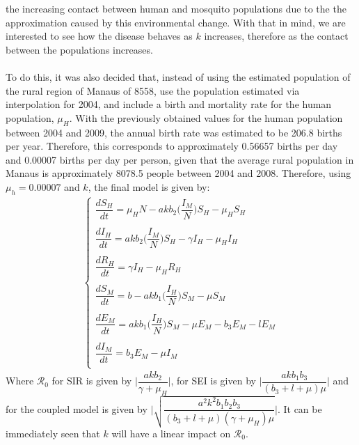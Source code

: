 the increasing contact between human and mosquito populations due to the
the approximation caused by this environmental change. With that in mind, 
we are interested to see how the disease behaves as $k$ increases, therefore
as the contact between the populations increases.
\\\\
To do this, it was also decided that, instead of using the estimated population 
of the rural region of Manaus of 8558, use the population estimated via interpolation 
for 2004, and include a birth and mortality rate for the human population, $\mu_H$. 
With the previously obtained values for the human population 
between 2004 and 2009, the annual birth rate was 
estimated to be 206.8 births per year. Therefore, this corresponds 
to approximately 0.56657 births per day and 0.00007 births per day 
per person, given that the average rural population in Manaus is 
approximately 8078.5 people between 2004 and 2008. Therefore, using $\mu_h = 0.00007$ 
and $k$, the final model is given by:
\begin{gather*}
        \begin{cases}
        \dfrac{dS_H}{dt} = \mu_HN-akb_2\bigg(\dfrac{I_M}{N}\bigg)S_H - \mu_HS_H\\
        \\
        \dfrac{dI_H}{dt} = akb_2\bigg(\dfrac{I_M}{N}\bigg)S_H-\gamma I_H - \mu_HI_H\\
        \\
        \dfrac{dR_H}{dt} = \gamma I_H - \mu_HR_H\\
        \\
        \dfrac{dS_M}{dt} = b - akb_1\bigg(\dfrac{I_H}{N}\bigg)S_M - \mu S_M\\
        \\
        \dfrac{dE_M}{dt} = akb_1\bigg(\dfrac{I_H}{N}\bigg)S_M - \mu E_M - b_3E_M -lE_M\\
        \\
        \dfrac{dI_M}{dt} = b_3E_M -\mu I_M\\
        \end{cases}
        \end{gather*}
Where $\mathcal{R}_0$ for SIR is given by $\Big | \dfrac{akb_2}{\gamma + \mu_H}\Big | $,
for SEI is given by $\Big | \dfrac{akb_1b_3}{(b_3 + l + \mu)\mu}\Big | $
and for the coupled model is given by $\Big | \sqrt{\dfrac{a^2k^2b_1b_2b_3}{(b_3+l+\mu)(\gamma+\mu_H)\mu}}\Big | $.
It can be immediately seen that $k$ will have a linear impact on
$\mathcal{R}_0$.
\\\\
